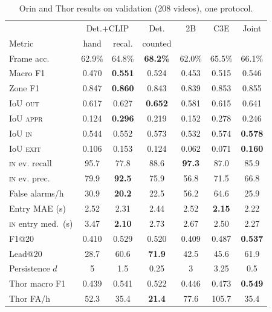 \documentclass[conference]{IEEEtran}
\let\oldtextsc\textsc
\renewcommand{\textsc}[1]{\mbox{\oldtextsc{#1}}}
\begin{document}
\begin{table}[t]
\centering
\caption{Orin and Thor results on validation (208 videos), one protocol.}
\label{tab:main}
\footnotesize
\setlength{\tabcolsep}{9pt}
\begin{tabular}{@{}lcccccc@{}}
\toprule
 & \multicolumn{2}{c}{Det.+CLIP} & Det. & 2B & C3E & Joint \\
Metric & hand & recal. & counted & & & \\
\midrule
Frame acc. & 62.9\% & 64.8\% & \textbf{68.2\%} & 62.0\% & 65.5\% & 66.1\% \\
Macro F1 & 0.470 & \textbf{0.551} & 0.524 & 0.453 & 0.515 & 0.546 \\
Zone F1 & 0.847 & \textbf{0.860} & 0.843 & 0.839 & 0.853 & 0.855 \\
\midrule
IoU \textsc{out} & 0.617 & 0.627 & \textbf{0.652} & 0.581 & 0.615 & 0.641 \\
IoU \textsc{appr} & 0.124 & \textbf{0.296} & 0.219 & 0.152 & 0.278 & 0.246 \\
IoU \textsc{in} & 0.544 & 0.552 & 0.573 & 0.532 & 0.574 & \textbf{0.578} \\
IoU \textsc{exit} & 0.106 & 0.153 & 0.124 & 0.062 & 0.071 & \textbf{0.160} \\
\midrule
\textsc{in} ev. recall & 95.7 & 77.8 & 88.6 & \textbf{97.3} & 87.0 & 85.9 \\
\textsc{in} ev. prec. & 79.9 & \textbf{92.5} & 75.9 & 56.8 & 71.5 & 66.8 \\
False alarms/h & 30.9 & \textbf{20.2} & 22.5 & 56.2 & 64.6 & 25.9 \\
\midrule
Entry MAE (s) & 2.52 & 2.31 & 2.44 & 2.52 & \textbf{2.15} & 2.22 \\
\textsc{in} entry med.\ (s) & 3.47 & \textbf{2.10} & 2.73 & 2.67 & 2.50 & 2.27 \\
\midrule
F1@20 & 0.410 & 0.529 & 0.520 & 0.409 & 0.487 & \textbf{0.537} \\
Lead@20 & 28.7 & 60.6 & \textbf{71.9} & 42.5 & 45.6 & 61.9 \\
Persistence $d$ & 5 & 1.5 & 0.25 & 3 & 3.25 & 0.5 \\
\midrule
Thor macro F1 & 0.439 & 0.541 & 0.522 & 0.446 & 0.473 & \textbf{0.549} \\
Thor FA/h & 52.3 & 35.4 & \textbf{21.4} & 77.6 & 105.7 & 35.4 \\
\bottomrule
\end{tabular}
\par{}
\end{table}
\end{document}
